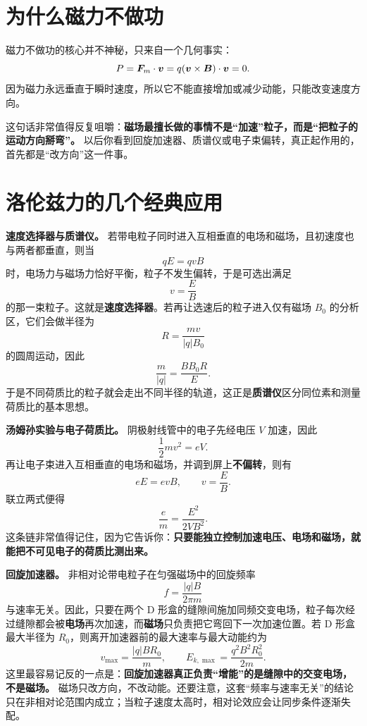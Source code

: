 \documentclass[lang=cn,11pt]{elegantbook}
\newcommand{\bridge}[1]{\begin{note}#1\end{note}}
\begin{document}
\begin{center}
\end{center}

\section{为什么磁力不做功}

磁力不做功的核心并不神秘，只来自一个几何事实：
\[
P=\vb*{F}_m\cdot \vb*{v}
=q(\vb*{v}\times \vb*{B})\cdot \vb*{v}=0.
\]
因为磁力永远垂直于瞬时速度，所以它不能直接增加或减少动能，只能改变速度方向。

\bridge{这句话非常值得反复咀嚼：\textbf{磁场最擅长做的事情不是“加速”粒子，而是“把粒子的运动方向掰弯”。} 以后你看到回旋加速器、质谱仪或电子束偏转，真正起作用的，首先都是“改方向”这一件事。}

\section{洛伦兹力的几个经典应用}

\textbf{速度选择器与质谱仪。} 若带电粒子同时进入互相垂直的电场和磁场，且初速度也与两者都垂直，则当
\[
qE=qvB
\]
时，电场力与磁场力恰好平衡，粒子不发生偏转，于是可选出满足
\[
v=\frac{E}{B}
\]
的那一束粒子。这就是\textbf{速度选择器}。若再让选速后的粒子进入仅有磁场 \(B_0\) 的分析区，它们会做半径为
\[
R=\frac{mv}{|q|B_0}
\]
的圆周运动，因此
\[
\frac{m}{|q|}=\frac{BB_0R}{E}.
\]
于是不同荷质比的粒子就会走出不同半径的轨道，这正是\textbf{质谱仪}区分同位素和测量荷质比的基本思想。

\textbf{汤姆孙实验与电子荷质比。} 阴极射线管中的电子先经电压 \(V\) 加速，因此
\[
\frac12 mv^2=eV.
\]
再让电子束进入互相垂直的电场和磁场，并调到屏上\textbf{不偏转}，则有
\[
eE=evB,
\qquad
v=\frac{E}{B}.
\]
联立两式便得
\[
\frac{e}{m}=\frac{E^2}{2VB^2}.
\]
这条链非常值得记住，因为它告诉你：\textbf{只要能独立控制加速电压、电场和磁场，就能把不可见电子的荷质比测出来。}

\textbf{回旋加速器。} 非相对论带电粒子在匀强磁场中的回旋频率
\[
f=\frac{|q|B}{2\pi m}
\]
与速率无关。因此，只要在两个 D 形盒的缝隙间施加同频交变电场，粒子每次经过缝隙都会被\textbf{电场}再次加速，而\textbf{磁场}只负责把它弯回下一次加速位置。若 D 形盒最大半径为 \(R_0\)，则离开加速器前的最大速率与最大动能约为
\[
v_{\max}=\frac{|q|BR_0}{m},
\qquad
E_{k,\max}=\frac{q^2B^2R_0^2}{2m}.
\]
这里最容易记反的一点是：\textbf{回旋加速器真正负责“增能”的是缝隙中的交变电场，不是磁场。} 磁场只改方向，不改动能。还要注意，这套“频率与速率无关”的结论只在非相对论范围内成立；当粒子速度太高时，相对论效应会让同步条件逐渐失配。
\end{document}
